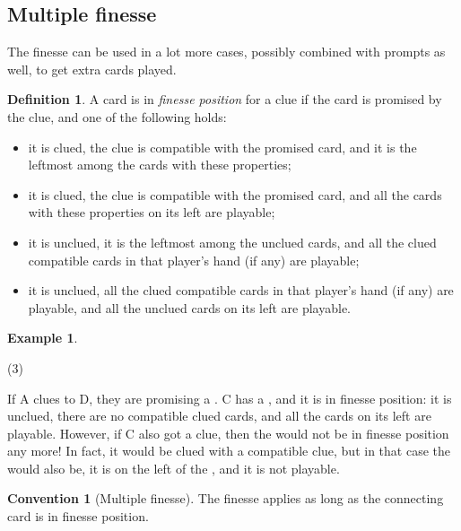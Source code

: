 \documentclass[a4paper]{article}
\theoremstyle{plain}
\theoremstyle{definition}
\newtheorem{definition}[theorem]{Definition}
\newtheorem{example}[theorem]{Example}
\newtheorem{convention}[theorem]{Convention}
\begin{document}
\subsection{Multiple finesse}

The finesse can be used in a lot more cases, possibly combined with prompts as well, to get extra cards played.

\begin{definition}
	\label{def:finesse-position}
	A card is in \emph{finesse position} for a clue if the card is promised by the clue, and one of the following holds:
	
	\begin{itemize}
		\item it is clued, the clue is compatible with the promised card, and it is the leftmost among the cards with these properties;
		\item it is clued, the clue is compatible with the promised card, and all the cards with these properties on its left are playable;
		\item it is unclued, it is the leftmost among the unclued cards, and all the clued compatible cards in that player's hand (if any) are playable;
		\item it is unclued, all the clued compatible cards in that player's hand (if any) are playable, and all the unclued cards on its left are playable.
	\end{itemize}
\end{definition}

\begin{example}
	\hfill
	\begin{tasks}(3)
		\task[+]      
		\task[A]    
		\task[B]    
		\task[C]    
		\task[D]    
		\task[E]    
	\end{tasks}
	
	If A clues  to D, they are promising a . C has a , and it is in finesse position: it is unclued, there are no compatible clued cards, and all the cards on its left are playable. However, if C also got a  clue, then the  would not be in finesse position any more! In fact, it would be clued with a compatible clue, but in that case the  would also be, it is on the left of the , and it is not playable.
\end{example}

\begin{convention}[Multiple finesse]
	\label{multiple-finesse}
	The finesse applies as long as the connecting card is in finesse position.
\end{convention}
\end{document}
